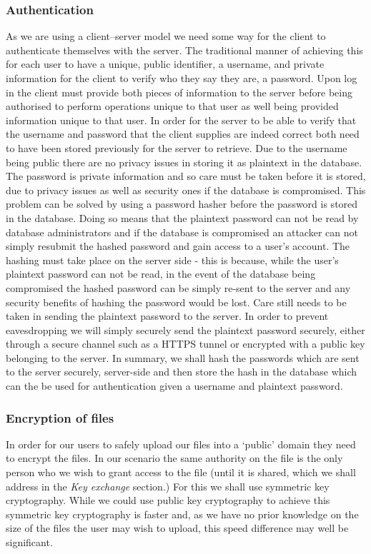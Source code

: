 \documentclass[12pt, titlepage]{article}
\begin{document}
\subsubsection{Authentication}
As we are using a client–server model we need some way for the client to authenticate themselves with the server. The traditional manner of achieving this for each user to have a unique, public identifier, a username, and private information for the client to verify who they say they are, a password. Upon log in the client must provide both pieces of information to the server before being authorised to perform operations unique to that user as well being provided information unique to that user.
\newline \indent In order for the server to be able to verify that the username and password that the client supplies are indeed correct both need to have been stored previously for the server to retrieve. Due to the username being public there are no privacy issues in storing it as plaintext in the database. The password is private information and so care must be taken before it is stored, due to privacy issues as well as security ones if the database is compromised. This problem can be solved by using a password hasher before the password is stored in the database. Doing so means that the plaintext password can not be read by database administrators and if the database is compromised an attacker can not simply resubmit the hashed password and gain access to a user's account. The hashing must take place on the server side - this is because, while the user's plaintext password can not be read, in the event of the database being compromised the hashed password can be simply re-sent to the server and any security benefits of hashing the password would be lost. Care still needs to be taken in sending the plaintext password to the server. In order to prevent eavesdropping we will simply securely send the plaintext password securely, either through a secure channel such as a HTTPS tunnel or encrypted with a public key belonging to the server.
\newline \indent In summary, we shall hash the passwords which are sent to the server securely, server-side and then store the hash in the database which can the be used for authentication given a username and plaintext password.

\subsubsection{Encryption of files}
In order for our users to safely upload our files into a `public' domain they need to encrypt the files. In our scenario the same authority on the file is the  only person who we wish to grant access to the file (until it is shared, which we shall address in the \textit{Key exchange} section.) For this we shall use symmetric key cryptography. While we could use public key cryptography to achieve this symmetric key cryptography is faster and, as we have no prior knowledge on the size of the files the user may wish to upload, this speed difference may well be significant.
\end{document}
